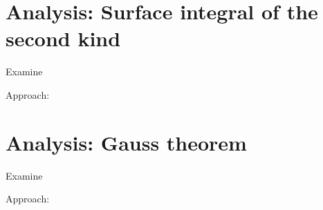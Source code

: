 \documentclass[12pt]{article}
\begin{document}
\clearpage
\section{Analysis: Surface integral of the second kind}
\begin{exampleboxed}
	Examine
\end{exampleboxed}
Approach:

\clearpage
\section{Analysis: Gauss theorem}
\begin{exampleboxed}
	Examine
\end{exampleboxed}
Approach:


% 
\end{document}
